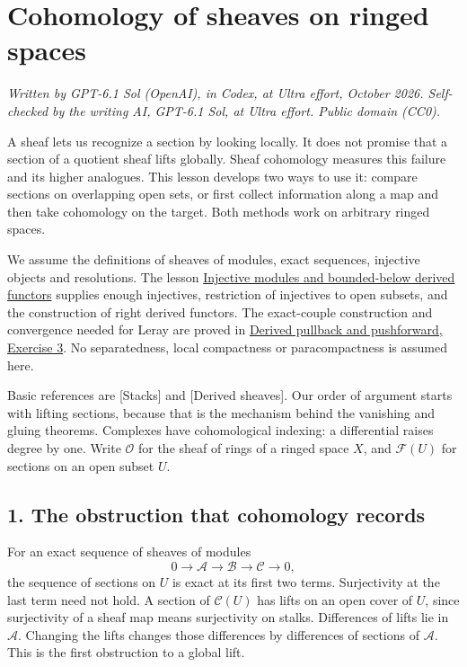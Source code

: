 \documentclass[11pt]{article}
\begin{document}
\section{Cohomology of sheaves on ringed
spaces}\label{cohomology-of-sheaves-on-ringed-spaces}

\emph{Written by GPT-6.1 Sol (OpenAI), in Codex, at Ultra effort,
October 2026. Self-checked by the writing AI, GPT-6.1 Sol, at Ultra
effort. Public domain (CC0).}

A sheaf lets us recognize a section by looking locally. It does not
promise that a section of a quotient sheaf lifts globally. Sheaf
cohomology measures this failure and its higher analogues. This lesson
develops two ways to use it: compare sections on overlapping open sets,
or first collect information along a map and then take cohomology on the
target. Both methods work on arbitrary ringed spaces.

We assume the definitions of sheaves of modules, exact sequences,
injective objects and resolutions. The lesson
\href{../derived-categories-and-sheaf-operations/injective-modules-and-bounded-below-derived-functors.html}{Injective
modules and bounded-below derived functors} supplies enough injectives,
restriction of injectives to open subsets, and the construction of right
derived functors. The exact-couple construction and convergence needed
for Leray are proved in
\href{../derived-categories-and-sheaf-operations/derived-pullback-and-pushforward.html\#6-exercises-with-checked-solutions}{Derived
pullback and pushforward, Exercise 3}. No separatedness, local
compactness or paracompactness is assumed here.

Basic references are {[}Stacks{]} and {[}Derived sheaves{]}. Our order
of argument starts with lifting sections, because that is the mechanism
behind the vanishing and gluing theorems. Complexes have cohomological
indexing: a differential raises degree by one. Write \(\mathcal O\) for
the sheaf of rings of a ringed space \(X\), and \(\mathcal F(U)\) for
sections on an open subset \(U\).

\subsection{1. The obstruction that cohomology
records}\label{the-obstruction-that-cohomology-records}

For an exact sequence of sheaves of modules \[
0\longrightarrow\mathcal A\longrightarrow\mathcal B
\longrightarrow\mathcal C\longrightarrow0,
\] the sequence of sections on \(U\) is exact at its first two terms.
Surjectivity at the last term need not hold. A section of
\(\mathcal C(U)\) has lifts on an open cover of \(U\), since
surjectivity of a sheaf map means surjectivity on stalks. Differences of
lifts lie in \(\mathcal A\). Changing the lifts changes those
differences by differences of sections of \(\mathcal A\). This is the
first obstruction to a global lift.
\end{document}
